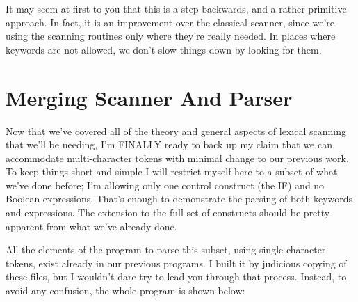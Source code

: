 It may seem  at first to you that this is a step backwards, and a rather  primitive  approach. In fact, it is an improvement over the classical scanner, since we're  using  the  scanning routines only where they're really needed. In places  where  keywords are not allowed, we don't slow things down by looking for them.

\section{Merging Scanner And Parser}

Now that we've covered  all  of the theory and general aspects of lexical scanning that we'll be needing, I'm FINALLY ready to back up my claim that  we  can  accommodate multi-character tokens with minimal change to our previous work. To keep  things  short  and simple I will restrict myself here to a subset of what we've done before; I'm allowing only one control construct (the  IF)  and no Boolean expressions. That's enough to demonstrate the parsing of both keywords and expressions. The extension to the full  set of constructs should be  pretty  apparent  from  what  we've already done.

All  the  elements  of  the  program to parse this subset, using single-character tokens, exist  already in our previous programs. I built it by judicious copying of these files, but  I  wouldn't dare try to lead you through that process. Instead, to avoid any confusion, the whole program is shown below:

